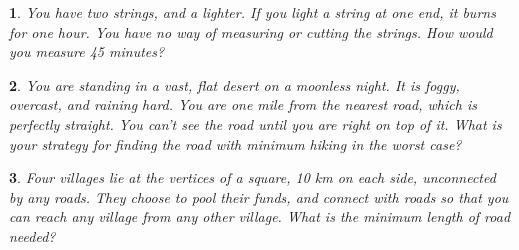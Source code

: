 \documentclass{report}
\newtheorem{problem}{}
\numberwithin{problem}{chapter} %
\begin{document}
\begin{problem}
You have two strings, and a lighter. If you light a string at one end, it burns for one hour. You have no way of measuring or cutting the strings. How would you measure 45 minutes? \end{problem}

\begin{problem}
You are standing in a vast, flat desert on a moonless night. It is foggy, overcast, and raining hard. You are one mile from the nearest road, which is perfectly straight.  You can't see the road until you are right on top of it. What is your strategy for finding the road with minimum hiking in the worst case?
\end{problem}

\begin{problem}
Four villages lie at the vertices of a square, 10 km on each side, unconnected by any roads. They choose to pool their funds, and connect with roads so that you can reach any village from any other village. What is the minimum length of road needed?
\end{problem}

\printbibliography
\end{document}
